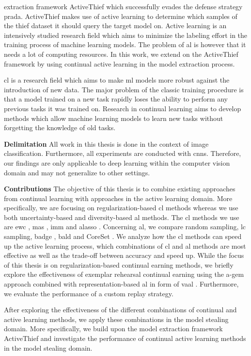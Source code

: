 extraction framework ActiveThief \cite{pal2020activethief} which successfully evades the defense strategy  \gls{prada}. ActiveThief makes use of active
learning to determine which samples of the thief dataset it should query the target model on. Active learning is an intensively studied research
field which aims to minimize the labeling effort in the training process of machine learning models. The problem of \gls{al} is however that it
needs a lot of computing resources. In this work, we extend on the ActiveThief framework by using continual active learning in the model
extraction process.\par
\gls{cl} is a research field which aims to make \gls{ml} models more robust against the introduction of new data. The major problem
of the classic training procedure is that a model trained on a new task rapidly loses the ability to perform any previous tasks it was trained on.
Research in continual learning aims to develop methods which allow machine learning models to learn new tasks without forgetting the knowledge of old 
tasks. \par
\textbf{Delimitation} \hspace{0.2cm} All work in this thesis is done in the context of image classification. Furthermore, all experiments are conducted
with \glspl{cnn}. Therefore, our findings are only applicable to deep learning within the computer vision domain and may not generalize to other settings. \par
\textbf{Contributions} \hspace{0.2cm} The objective of this thesis is to combine existing approaches from continual learning
with approaches in the active learning domain. More specifically, we are focusing on regularization-based \gls{cl} methods
whereas we use both uncertainty-based and diversity-based \gls{al} methods. The \gls{cl} methods we use are \gls{ewc} \cite{kirkpatrick2017overcoming},
\gls{mas} \cite{aljundi2018memory}, \gls{imm} \cite{lee2017overcoming} and \gls{alasso} \cite{park2019continual}.
Concerning \gls{al}, we compare random sampling, \gls{lc} \cite{lewis1995sequential} sampling, \gls{badge} \cite{ash2019deep}, \gls{bald} \cite{houlsby2011bayesian} and
CoreSet \cite{sener2017active}.
We analyze how the \gls{cl} methods can speed up the active learning process, which combinations of \gls{cl} and \gls{al} methods
are most effective as well as the trade-off between accuracy and speed up. While the focus of this thesis is on regularization-based continual
earning methods, we briefly explore the effectiveness of exemplar rehearsal continual earning using the \gls{a-gem} approach \cite{chaudhry2018efficient}
combined with representation-based \gls{al} in form of \gls{vaal} \cite{sinha2019variational}. Furthermore, we evaluate the performance of a custom replay strategy.\par
After exploring the effectiveness of the different combinations of continual and active learning methods, we apply these combinations in the model stealing
domain. More specifically, we build upon the model extraction framework ActiveThief \cite{pal2020activethief} and investigate the performance of continual
active learning methods in the model stealing domain.
